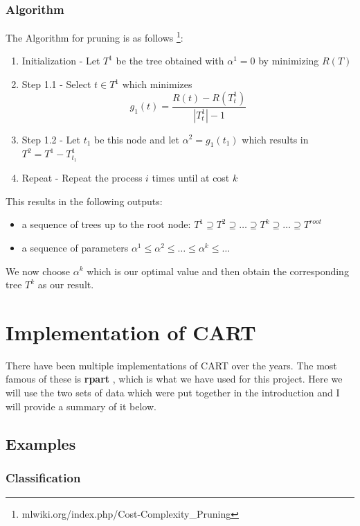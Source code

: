 \documentclass[11pt,a4paper]{report}
\begin{document}
\subsubsection{Algorithm}
The Algorithm for pruning is as follows \footnote{mlwiki.org/index.php/Cost-Complexity\_Pruning}:
\begin{enumerate}
    \item Initialization - Let $T^1$ be the tree obtained with $\alpha^1 = 0$ by minimizing $R(T)$
    
    \item Step 1.1 - Select $t \in T^1$ which minimizes
    \[ g_1 (t) = \frac{R(t)-R(T_t^1)}{|T_t^1| - 1} \]
    
    \item Step 1.2 - Let $t_1$ be this node and let $\alpha^2 = g_1 (t_1)$ which results in $T^2 = T^1 - T_{t_1}^1$
    
    \item Repeat - Repeat the process $i$ times until at cost $k$
\end{enumerate}
This results in the following outputs:
\begin{itemize}
    \item a sequence of trees up to the root node: $T^1 \supseteq T^2 \supseteq \dots \supseteq T^k \supseteq \dots \supseteq T^{root}$
    
    \item a sequence of parameters $\alpha^1 \leq \alpha^2 \leq \dots \leq \alpha^k \leq \dots$
\end{itemize}
We now choose $\alpha^k$ which is our optimal value and then obtain the corresponding tree $T^k$ as our result.


\section{Implementation of CART}
There have been multiple implementations of CART over the years. The most famous of these is \textbf{rpart} \cite{rpart}, which is what we have used for this project. 
Here we will use the two sets of data which were put together in the introduction and I will provide a summary of it below.

\subsection{Examples}
\subsubsection{Classification}
\end{document}
